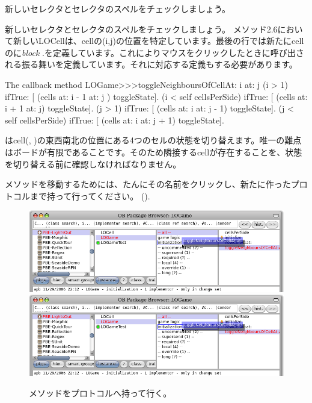 \documentclass[a4paper,10pt,twoside]{book}
\begin{document}
新しいセレクタとセレクタのスペルをチェックしましょう。

 新しいセレクタとセレクタのスペルをチェックしましょう。
メソッド2.6において新しいLOCellは、cellの(i,j)の位置を特定しています。最後の行では新たにcellのに\emph{block}
\mbox{.}を定義しています。これによりマウスをクリックしたときに呼び出される振る舞いを定義しています。それに対応する定義もする必要があります。

\begin{method}[toggleNeighboursOfCellAt:at:]{The callback method}
LOGame>>>toggleNeighboursOfCellAt: i at: j
   (i > 1) ifTrue: [ (cells at: i - 1 at: j ) toggleState].
   (i < self cellsPerSide) ifTrue: [ (cells at: i + 1 at: j) toggleState].
   (j > 1) ifTrue: [ (cells at: i  at: j - 1) toggleState].
   (j < self cellsPerSide) ifTrue: [ (cells at: i at: j + 1) toggleState].
\end{method}

 はcell(, )の東西南北の位置にある4つのセルの状態を切り替えます。唯一の難点はボードが有限であることです。そのため隣接するcellが存在することを、状態を切り替える前に確認しなければなりません。

メソッドを移動するためには、たんにその名前をクリックし、新たに作ったプロトコルまで持って行ってください。 ().

\begin{figure}[htbp]
   \centering
   \ifluluelse
		{\includegraphics[width=\textwidth]{DragMethod} }
		{\includegraphics[scale=0.7]{DragMethod} }
   \caption{メソッドをプロトコルへ持って行く。}
\end{figure}
\end{document}
